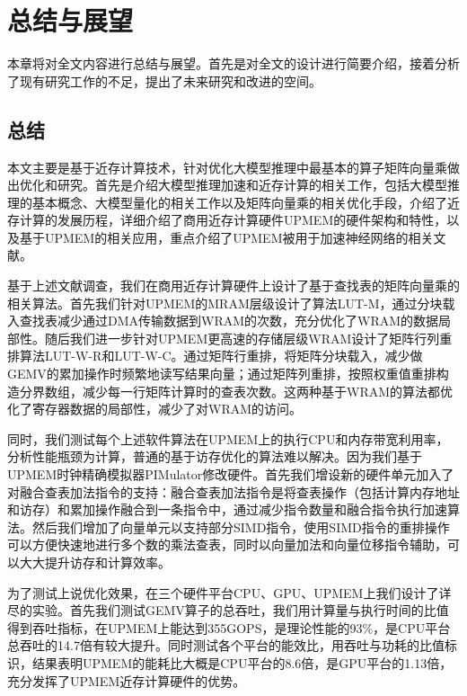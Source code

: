 \chapter{总结与展望}
本章将对全文内容进行总结与展望。首先是对全文的设计进行简要介绍，接着分析了现有研究工作的不足，提出了未来研究和改进的空间。
\section{总结}
本文主要是基于近存计算技术，针对优化大模型推理中最基本的算子矩阵向量乘做出优化和研究。首先是介绍大模型推理加速和近存计算的相关工作，包括大模型推理的基本概念、大模型量化的相关工作以及矩阵向量乘的相关优化手段，介绍了近存计算的发展历程，详细介绍了商用近存计算硬件UPMEM的硬件架构和特性，以及基于UPMEM的相关应用，重点介绍了UPMEM被用于加速神经网络的相关文献。

基于上述文献调查，我们在商用近存计算硬件上设计了基于查找表的矩阵向量乘的相关算法。首先我们针对UPMEM的MRAM层级设计了算法LUT-M，通过分块载入查找表减少通过DMA传输数据到WRAM的次数，充分优化了WRAM的数据局部性。随后我们进一步针对UPMEM更高速的存储层级WRAM设计了矩阵行列重排算法LUT-W-R和LUT-W-C。通过矩阵行重排，将矩阵分块载入，减少做GEMV的累加操作时频繁地读写结果向量；通过矩阵列重排，按照权重值重排构造分界数组，减少每一行矩阵计算时的查表次数。这两种基于WRAM的算法都优化了寄存器数据的局部性，减少了对WRAM的访问。

同时，我们测试每个上述软件算法在UPMEM上的执行CPU和内存带宽利用率，分析性能瓶颈为计算，普通的基于访存优化的算法难以解决。因为我们基于UPMEM时钟精确模拟器PIMulator修改硬件。首先我们增设新的硬件单元加入了对融合查表加法指令的支持：融合查表加法指令是将查表操作（包括计算内存地址和访存）和累加操作融合到一条指令中，通过减少指令数量和融合指令执行加速算法。然后我们增加了向量单元以支持部分SIMD指令，使用SIMD指令的重排操作可以方便快速地进行多个数的乘法查表，同时以向量加法和向量位移指令辅助，可以大大提升访存和计算效率。

为了测试上说优化效果，在三个硬件平台CPU、GPU、UPMEM上我们设计了详尽的实验。首先我们测试GEMV算子的总吞吐，我们用计算量与执行时间的比值得到吞吐指标，在UPMEM上能达到355GOPS，是理论性能的93\%，是CPU平台总吞吐的14.7倍有较大提升。同时测试各个平台的能效比，用吞吐与功耗的比值标识，结果表明UPMEM的能耗比大概是CPU平台的8.6倍，是GPU平台的1.13倍，充分发挥了UPMEM近存计算硬件的优势。

